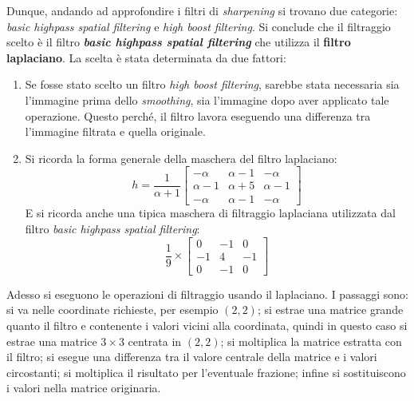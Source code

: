 \documentclass[a4paper]{article}
\begin{document}
	\noindent
	Dunque, andando ad approfondire i filtri di \emph{sharpening} si trovano due categorie: \emph{basic highpass spatial filtering} e \emph{high boost filtering}. Si conclude che il filtraggio scelto è il filtro \emph{\textbf{basic highpass spatial filtering}} che utilizza il \textbf{filtro laplaciano}. La scelta è stata determinata da due fattori:
	\begin{enumerate}
		\item Se fosse stato scelto un filtro \emph{high boost filtering}, sarebbe stata necessaria sia l'immagine prima dello \emph{smoothing}, sia l'immagine dopo aver applicato tale operazione. Questo perché, il filtro lavora eseguendo una differenza tra l'immagine filtrata e quella originale.
		
		\item Si ricorda la forma generale della maschera del filtro laplaciano:
		\begin{equation*}
			h = \dfrac{1}{\alpha + 1} \begin{bmatrix}
				-\alpha & \alpha-1 & -\alpha \\
				\alpha-1 & \alpha+5 & \alpha-1 \\
				-\alpha & \alpha-1 & -\alpha
			\end{bmatrix}
		\end{equation*}
		E si ricorda anche una tipica maschera di filtraggio laplaciana utilizzata dal filtro \emph{basic highpass spatial filtering}:
		\begin{equation*}
			\dfrac{1}{9} \times \begin{bmatrix}
				0 & -1 & 0 \\
				-1 & 4 & -1 \\
				0 & -1 & 0
			\end{bmatrix}
		\end{equation*}
	\end{enumerate}\newpage
	
	\noindent
	Adesso si eseguono le operazioni di filtraggio usando il laplaciano. I passaggi sono: si va nelle coordinate richieste, per esempio $\left(2,2\right)$; si estrae una matrice grande quanto il filtro e contenente i valori vicini alla coordinata, quindi in questo caso si estrae una matrice $3 \times 3$ centrata in $\left(2,2\right)$; si moltiplica la matrice estratta con il filtro; si esegue una differenza tra il valore centrale della matrice e i valori circostanti; si moltiplica il risultato per l'eventuale frazione; infine si sostituiscono i valori nella matrice originaria.\newline
	
\end{document}
